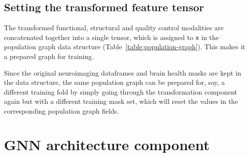 \subsection{Setting the transformed feature tensor}
The transformed functional, structural and quality control modalities are concatenated together into a single tensor, which is assigned to \texttt{x} in the population graph data structure (Table~\ref{table:population-graph}). This makes it a prepared graph for training.

Since the original neuroimaging dataframes and brain health masks are kept in the data structure, the same population graph can be prepared for, say, a different training fold by simply going through the transformation component again but with a different training mask set, which will reset the values in the corresponding population graph fields.

\section{GNN architecture component}


